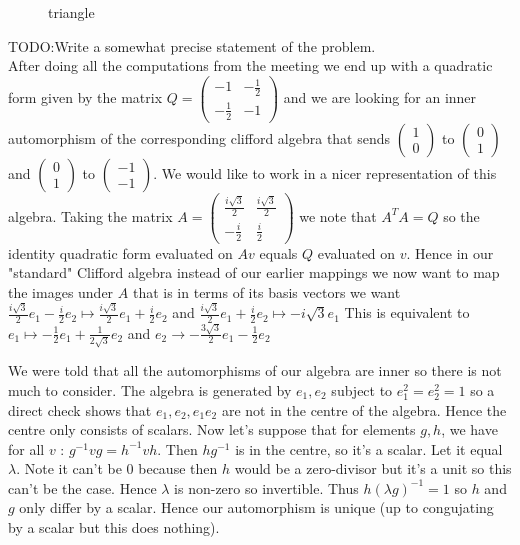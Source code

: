 \documentclass[a4paper]{article}
\begin{document}
\begin{figure}[ht]
    \centering
    \caption{triangle}
    \label{fig:triangle}
\end{figure}
TODO:Write a somewhat precise statement of the problem.\\

After doing all the computations from the meeting we end up with a quadratic form given by the matrix $Q=\begin{pmatrix} -1 & -\frac{1}{2}\\-\frac{1}{2} & -1 \end{pmatrix} $ and we are looking for an inner automorphism of the corresponding clifford algebra that sends $\begin{pmatrix} 1\\0 \end{pmatrix}$ to $\begin{pmatrix} 0\\1 \end{pmatrix}$ and $ \begin{pmatrix}0\\ 1 \end{pmatrix}$ to $\begin{pmatrix} -1\\ -1\end{pmatrix}$. We would like to work in a nicer representation of this algebra. 
Taking the matrix $A=\begin{pmatrix} \frac{i\sqrt{3} }{2} & \frac{i\sqrt{3} }{2}\\-\frac{i}{2}&\frac{i}{2} \end{pmatrix} $ we note that $A^{T}A=Q$ so the identity quadratic form evaluated on $Av$ equals $Q$ evaluated on $v$. Hence in our "standard" Clifford algebra instead of our earlier mappings we now want to map the images under $A$ that is in terms of its basis vectors we want $\frac{i\sqrt{3}}{2}e_1-\frac{i}{2}e_2\mapsto \frac{i\sqrt{3} }{2}e_1+\frac{i}{2}e_2$ and $\frac{i\sqrt{3} }{2}e_1+\frac{i}{2}e_2\mapsto -i\sqrt{3}e_1 $
This is equivalent to $e_1\mapsto -\frac{1}{2}e_1+\frac{1}{2\sqrt{3} }e_{2}$ and $e_2\to -\frac{3\sqrt{3} }{2}e_1-\frac{1}{2}e_2$

We were told that all the automorphisms of our algebra are inner so there is not much to consider. The algebra is generated by $e_1,e_2$ subject to $e_1^2=e_2^2=1$ so a direct check shows that $e_1,e_2, e_1e_2$ are not in the centre of the algebra. Hence the centre only consists of scalars.  Now let's suppose that for elements $g,h$, we have for all  $v$ :  $g^{-1}vg=h^{-1}vh$. Then $hg^{-1}$ is in the centre, so it's a scalar. Let it equal $\lambda$. Note it can't be 0 because then  $h$ would be a zero-divisor but it's a unit so this can't be the case. Hence $\lambda$ is non-zero so invertible. Thus $h\left( \lambda g \right) ^{-1}=1$ so $h$ and $g$ only differ by a scalar. Hence our automorphism is unique (up to congujating by a scalar but this does nothing).
\end{document}

